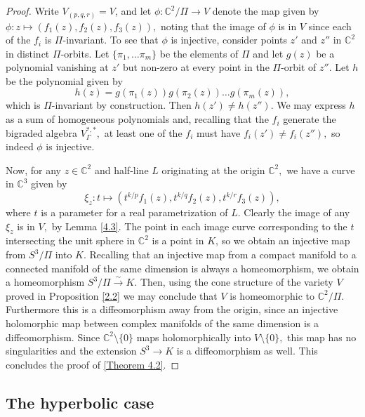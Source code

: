 \documentclass{article}
\begin{document}
\begin{proof}
Write $V_{(p,q,r)} = V$, and let $\phi: \mathbb{C}^2/\Pi \to V$ denote the map given by $\phi: z \mapsto (f_1(z), f_2(z), f_3(z)),$ noting that the image of $\phi$ is in $V$ since each of the $f_i$ is $\Pi$-invariant. To see that $\phi$ is injective, consider points $z'$ and $z''$ in $\mathbb{C}^2$ in distinct $\Pi$-orbits. Let $\{\pi_1, \dots \pi_m\}$ be the elements of $\Pi$ and let $g(z)$ be a polynomial vanishing at $z'$ but non-zero at every point in the $\Pi$-orbit of $z''$. Let $h$ be the polynomial given by
\[h(z) = g(\pi_1(z))g(\pi_2(z))\dots g(\pi_m(z)),\]
which is $\Pi$-invariant by construction. Then $h(z') \neq h(z'')$. We may express $h$ as a sum of homogeneous polynomials and, recalling that the $f_i$ generate the bigraded algebra $V_{\Gamma}^{\ast, \ast},$ at least one of the $f_i$ must have $f_i(z') \neq f_i(z''),$ so indeed $\phi$ is injective.

Now, for any $z \in \mathbb{C}^2$ and half-line $L$ originating at the origin $\mathbb{C}^2,$ we have a curve in $\mathbb{C}^3$ given by
\[\xi_z: t \mapsto (t^{k/p}f_1(z), t^{k/q}f_2(z), t^{k/r}f_3(z)),\]
where $t$ is a parameter for a real parametrization of $L$. Clearly the image of any $\xi_z$ is in $V,$ by Lemma \ref{4.3}. The point in each image curve corresponding to the $t$ intersecting the unit sphere in $\mathbb{C}^2$ is a point in $K$, so we obtain an injective map from $S^3/\Pi$ into $K$. Recalling that an injective map from a compact manifold to a connected manifold of the same dimension is always a homeomorphism, we obtain a homeomorphism $S^3/\Pi \xrightarrow{\sim} K$. Then, using the cone structure of the variety $V$ proved in Proposition \ref{2.2} we may conclude that $V$ is homeomorphic to $\mathbb{C}^2/\Pi$. Furthermore this is a diffeomorphism away from the origin, since an injective holomorphic map between complex manifolds of the same dimension is a diffeomorphism. Since $\mathbb{C}^2\setminus \{0\}$ maps holomorphically into $V\setminus \{0\},$ this map has no singularities and the extension $S^3 \to K$ is a diffeomorphism as well. This concludes the proof of \ref{Theorem 4.2}.

\end{proof}

\subsection{The hyperbolic case}
\end{document}
